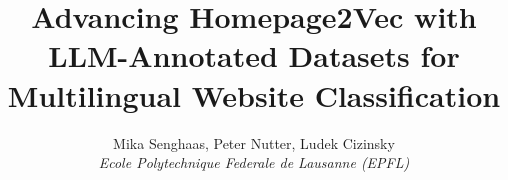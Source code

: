 \documentclass[10pt,conference,compsocconf]{IEEEtran}
\begin{document}
\title{
  Advancing Homepage2Vec with LLM-Annotated Datasets for Multilingual Website Classification
}

\author{
  Mika Senghaas, Peter Nutter, Ludek Cizinsky\\
  \textit{Ecole Polytechnique Federale de Lausanne (EPFL)}\\
}
\maketitle











\newpage




\appendix


\end{document}
